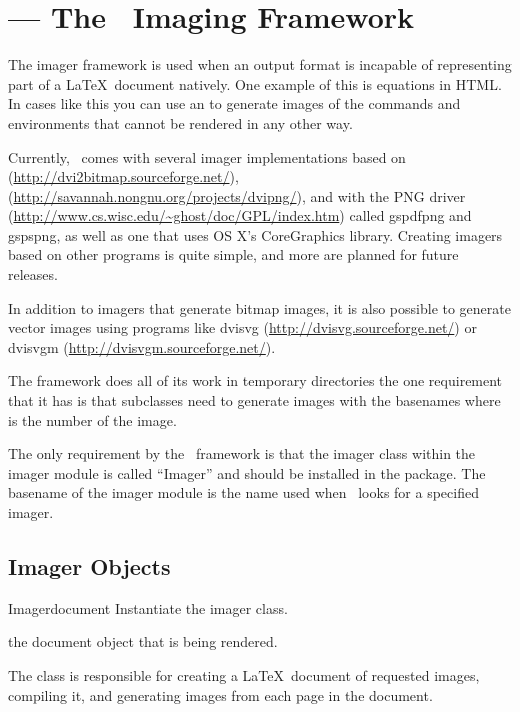 
\section{ --- The \plasTeX\ Imaging Framework\label{sec:imager-api}}


The imager framework is used when an output format is incapable of 
representing part of a \LaTeX\ document natively.  One example of this
is equations in HTML.  In cases like this you can use an 
 to generate images of the commands and environments
that cannot be rendered in any other way.

Currently, \plasTeX\ comes with several imager implementations based
on  (\url{http://dvi2bitmap.sourceforge.net/}),
 (\url{http://savannah.nongnu.org/projects/dvipng/}),
and  with the PNG driver 
(\url{http://www.cs.wisc.edu/~ghost/doc/GPL/index.htm}) called gspdfpng
and gspspng, as well as one that uses OS X's CoreGraphics library.
Creating imagers based on other programs is quite simple,
and more are planned for future releases.

In addition to imagers that generate bitmap images, it is also possible to
generate vector images using programs like dvisvg 
(\url{http://dvisvg.sourceforge.net/}) or 
dvisvgm (\url{http://dvisvgm.sourceforge.net/}).  

The  framework does all of its work in temporary directories
the one requirement that it has is that  subclasses need
to generate images with the basenames  where  is
the number of the image.

The only requirement by the \plasTeX\ framework is that the imager class
within the imager module is called ``Imager'' and should be installed in
the  package.  The basename of the imager
module is the name used when \plasTeX\ looks for a specified imager.


\subsection{Imager Objects}

\begin{classdesc}{Imager}{document}
Instantiate the imager class.

 the document object that is being rendered.

The  class is responsible for creating a \LaTeX\ document
of requested images, compiling it, and generating images from each
page in the document.
\end{classdesc}

